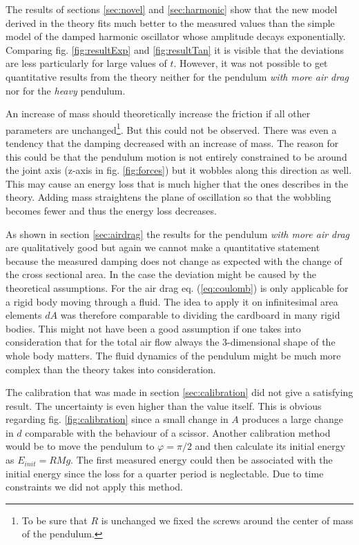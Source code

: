 The results of sections \ref{sec:novel} and \ref{sec:harmonic} show that the new model derived in the theory fits much better to the measured values than the simple model of the damped harmonic oscillator whose amplitude decays exponentially. Comparing fig. \ref{fig:resultExp} and \ref{fig:resultTan} it is visible that the deviations are less particularly for large values of $t$. However, it was not possible to get quantitative results from the theory neither for the pendulum \emph{with more air drag} nor for the \emph{heavy} pendulum. 

An increase of mass should theoretically increase the friction if all other parameters are unchanged\footnote{To be sure that $R$ is unchanged we fixed the screws around the center of mass of the pendulum. }. But this could not be observed. There was even a tendency that the damping decreased with an increase of mass. The reason for this could be that the pendulum motion is not entirely constrained to be around the joint axis (z-axis in fig. \ref{fig:forces}) but it wobbles along this direction as well. This may cause an energy loss that is much higher that the ones describes in the theory. Adding mass straightens the plane of oscillation so that the wobbling becomes fewer and thus the energy loss decreases. 

As shown in section \ref{sec:airdrag} the results for the pendulum \emph{with more air drag} are qualitatively good but again we cannot make a quantitative statement because the measured damping does not change as expected with the change of the cross sectional area. In the case the deviation might be caused by the theoretical assumptions. For the air drag eq. (\ref{eq:coulomb}) is only applicable for a rigid body moving through a fluid. The idea to apply it on infinitesimal area elements $dA$ was therefore comparable to dividing the cardboard in many rigid bodies. This might not have been a good assumption if one takes into consideration that for the total air flow always the 3-dimensional shape of the whole body matters. The fluid dynamics of the pendulum might be much more complex than the theory takes into consideration. 

The calibration that was made in section \ref{sec:calibration} did not give a satisfying result. The uncertainty is even higher than the value itself. This is obvious regarding fig. \ref{fig:calibration} since a small change in $A$ produces a large change in $d$ comparable with the behaviour of a scissor. Another calibration method would be to move the pendulum to $\varphi=\pi / 2$ and then calculate its initial energy as $E_{init}=RMg$. The first measured energy could then be associated with the initial energy since the loss for a quarter period is neglectable. Due to time constraints we did not apply this method.
